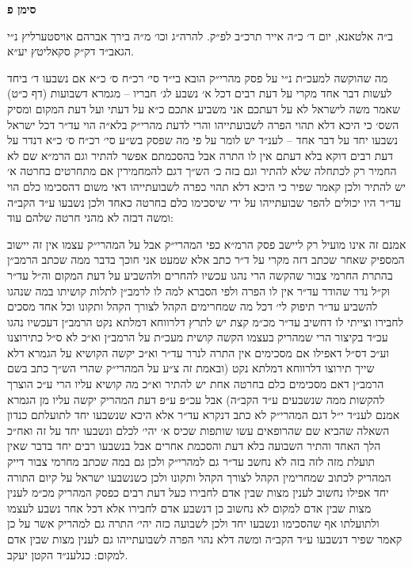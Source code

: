 \documentclass[12pt, openany]{book}
\newcommand{\chapname}{}
\newcommand{\newchap}[1]{
	\addcontentsline{toc}{chapter}{#1}
	\renewcommand{\chapname}{#1}
		\begin{center}
			\textbf{%
\fontsize{16pt}{16pt}\selectfont
				#1}
		\end{center}
}
\begin{document}
\newchap{סימן פ}
\begin{multicols}{2}
ב״ה אלטאנא, יום ד׳ כ״ה אייר תרכ״ב לפ״ק. להרה״ג וכו׳ מ״ה בירך אברהם אויסטערליץ נ״י הגאב״ד דק״ק סקאליטץ יע״א.\\\vspace{0pt}

מה שהוקשה למעכ״ת נ״י על פסק מהרי״ק הובא בי״ד סי׳ רכ״ח ס׳ כ״א אם נשבעו ד׳ ביחד לעשות דבר אחד מקרי על דעת רבים דכל א׳ נשבע לג׳ חבריו – מגמרא דשבועות (דף כ״ט) שאמר משה לישראל לא על דעתכם אני משביע אתכם כ״א על דעתי ועל דעת המקום ומסיק השס׳ כי היכא דלא תהוי הפרה לשבועתייהו והרי לדעת מהרי״ק בלא״ה הוי עד״ר דכל ישראל נשבעו יחד על דבר אחד – לענ״ד יש לומר על פי מה שפסק בש״ע סי׳ רכ״ח ס׳ כ״א דנדר על דעת רבים דוקא בלא דעתם אין לו התרה אבל בהסכמתם אפשר להתיר וגם הרמ״א שם לא החמיר רק לכתחלה שלא להתיר וגם בזה כ׳ הש״ך דגם להמחמירין אם מתחרטים בחרטה א׳ יש להתיר ולכן קאמר שפיר כי היכא דלא תהוי כפרה לשבועתייהו דאי משום דהסכימו כלם הוי עד״ר היו יכולים להפר שבועתייהו על ידי שיסכימו כלם בחרטה כאחד ולכן נשבעו ע״ד הקב״ה ומשה דבזה לא מהני חרטה שלהם עוד:\\\vspace{0pt}

אמנם זה אינו מועיל רק ליישב פסק הרמ״א כפי המהרי״ק אבל על המהרי״ק עצמו אין זה יישוב המספיק שאחר שכתב דזה מקרי על ד״ר כתב אלא שמעט אני חוכך בדבר ממה שכתב הרמב״ן בהתרת החרמי צבור שהקשה הרי נהגו עכשיו להחרים ולהשביע על דעת המקום וה״ל עד״ר וק״ל נדר שהודר עד״ר אין לו הפרה ולפי הסברא למה לו לרמב״ן לתלות קושיתו במה שנהגו להשביע עד״ר תיפוק לי׳ דכל מה שמחרימים הקהל לצורך הקהל ותקונו וכל אחד מסכים לחבירו וצייתי לו דחשיב עד״ר מכ״מ קצת יש לתרץ דלרווחא דמלתא נקט הרמב״ן דעכשיו נהגו עכ״ד בקיצור הרי שמהריק בעצמו הקשה קושית מעכ״ת על הרמב״ן וא״כ לא ס״ל כתירוצנו וע״כ דס״ל דאפילו אם מסכימים אין התרה לנרר עד״ר וא״כ יקשה הקושיא על הגמרא דלא שייך תירוצו דלרווחא דמלתא נקט (ובאמת זה צ״ע על המהרי״ק שהרי הש״ך כתב בשם הרמב״ן דאם מסכימים כלם בחרטה אחת יש להתיר וא״כ מה קושיא עליו הרי ע״כ הוצרך להקשות ממה שנשבעים ע״ד הקב״ה) אבל עכ״פ ע״פ דעת המהריק יקשה עליו מן הגמרא אמנם לענ״ד י״ל דגם המהרי״ק לא כתב דנקרא עד״ר אלא היכא שנשבעו יחד לתועלתם כנדון השאלה שהביא שם שהרופאים עשו שותפות שכיס א׳ יהי׳ לכלם ונשבעו יחד על זה ואח״כ הלך האחד והתיר השבועה בלא דעת והסכמת אחרים אבל בנשבעו רבים יחד בדבר שאין תועלת מזה לזה בזה לא נחשב עד״ר גם למהרי״ק ולכן גם במה שכתב מחרמי צבור דייק המהריק לכתוב שמחרימין הקהל לצורך הקהל ותקונו ולכן כשנשבעו ישראל על קיום התורה יחד אפילו נחשוב לענין מצות שבין אדם לחבירו כעל דעת רבים כפסק המהריק מכ״מ לענין מצות שבין אדם למקום לא נחשוב כן דנשבע אדם לחבירו אלא דכל אחר נשבע לעצמו ולתועלתו אף שהסכימו ונשבעו יחד ולכן לשבועה כזה יהי׳ התרה גם למהריק אשר על כן קאמר שפיר דנשבעו ע״ד הקב״ה ומשה דלא נהוי הפרה לשבועתייהו גם לענין מצות שבין אדם למקום: כנלענ״ד הקטן יעקב.\\\vspace{0pt}

\end{multicols}\newpage
\end{document}
